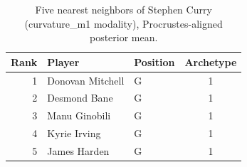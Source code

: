 \begin{table}[htbp]
  \centering\small
  \begin{tabular}{rllc}
    \toprule
    Rank & Player & Position & Archetype \\
    \midrule
    1 & Donovan Mitchell & G & 1 \\
    2 & Desmond Bane & G & 1 \\
    3 & Manu Ginobili & G & 1 \\
    4 & Kyrie Irving & G & 1 \\
    5 & James Harden & G & 1 \\
    \bottomrule
  \end{tabular}
  \caption{Five nearest neighbors of Stephen Curry (curvature_m1 modality), Procrustes-aligned posterior mean.}
  \label{tab:Stephen_Curry_neighbors_curvature_m1}
\end{table}

